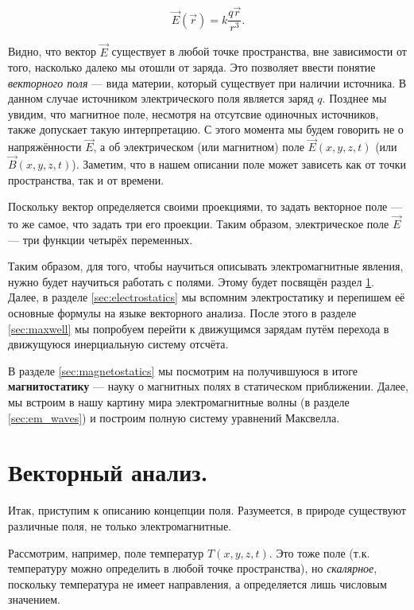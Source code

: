 \documentclass[a4paper,12pt]{article}
\numberwithin{equation}{section}
\begin{document}
\begin{equation}
  \label{eq:q_E}
  \vec{E} (\vec{r}) = k \frac{q \vec{r}}{r^3}.
\end{equation}

Видно, что вектор $\vec{E}$ существует в любой точке пространства, вне
зависимости от того, насколько далеко мы отошли от заряда. Это
позволяет ввести понятие \textit{векторного поля} --- вида материи,
который существует при наличии источника. В данном случае источником
электрического поля является заряд $q$. Позднее мы увидим, что
магнитное поле, несмотря на отсутсвие одиночных источников, также
допускает такую интерпретацию. С этого момента мы будем говорить не о
напряжённости $\vec{E}$, а об электрическом (или магнитном) поле
$\vec{E}(x,y,z,t)$ (или $\vec{B}(x,y,z,t)$). Заметим, что в нашем
описании поле может зависеть как от точки пространства, так и от
времени.

Поскольку вектор определяется своими проекциями, то задать векторное
поле --- то же самое, что задать три его проекции. Таким образом,
электрическое поле $\vec{E}$ --- три функции четырёх переменных. 

Таким образом, для того, чтобы научиться описывать электромагнитные
явления, нужно будет научиться работать с полями. Этому будет посвящён
раздел \ref{sec:vector_analysis}. Далее, в разделе
\ref{sec:electrostatics} мы вспомним электростатику и перепишем её
основные формулы на языке векторного анализа. После этого в разделе
\ref{sec:maxwell} мы попробуем перейти к движущимся зарядам путём
перехода в движущуюся инерциальную систему отсчёта.

В разделе \ref{sec:magnetostatics} мы посмотрим на получившуюся в
итоге \textbf{магнитостатику} --- науку о магнитных полях в
статическом приближении. Далее, мы встроим в нашу картину мира
электромагнитные волны (в разделе \ref{sec:em_waves}) и построим
полную систему уравнений Максвелла. 

\section{Векторный анализ.}
\label{sec:vector_analysis}

Итак, приступим к описанию концепции поля. Разумеется, в природе
существуют различные поля, не только электромагнитные. 

Рассмотрим, например, поле температур $T(x,y,z,t)$. Это
тоже поле (т.к. температуру можно определить в любой точке
пространства), но \textit{скалярное}, поскольку температура не имеет
направления, а определяется лишь числовым значением. 
\end{document}
